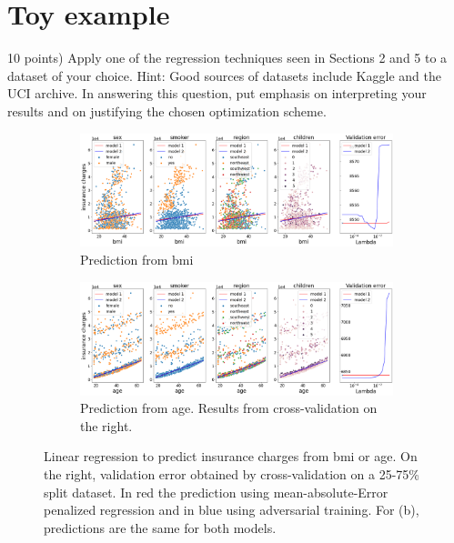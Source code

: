 \documentclass[10pt]{article}
\newenvironment{exercise}[2][Exercise]{\begin{trivlist}
  \item[\hskip \labelsep {\bfseries #1}\hskip \labelsep {\bfseries #2.}]}{\end{trivlist}}
\begin{document}
\section{Toy example}
\begin{exercise}{8} (10 points) Apply one of the regression techniques seen in Sections 2 and 5 to a dataset of your choice. Hint: Good sources of datasets
include Kaggle and the UCI archive. In answering this question, put emphasis
on interpreting your results and on justifying the chosen optimization scheme.

\begin{figure}[!ht]
     \centering
     \begin{subfigure}[b]{1\textwidth}
         \centering
         \includegraphics[width=\textwidth]{doc/images/bmi.png}
         \caption{Prediction from bmi}
         \label{fig:bmi}
     \end{subfigure}
     \hfill
     \begin{subfigure}[b]{1\textwidth}
         \centering
         \includegraphics[width=\textwidth]{doc/images/age.png}
         \caption{Prediction from age. Results from cross-validation on the right. }
         \label{fig:age}
     \end{subfigure}
        \caption{Linear regression to predict insurance charges from bmi or age. On the right, validation error obtained by cross-validation on a 25-75\% split dataset. In red the prediction using mean-absolute-Error penalized regression and in blue using adversarial training. For (b), predictions are the same for both models. }
        \label{fig:age-bmi-raw}
\end{figure}



\end{exercise}
\end{document}
